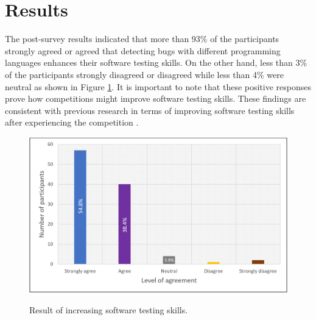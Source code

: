 \documentclass{article}
\begin{document}
\section{Results}
\label{section:results}
The post-survey results indicated that more than 93\% of the participants strongly agreed or agreed that detecting bugs with different programming languages enhances their software testing skills. On the other hand, less than 3\% of the participants strongly disagreed or disagreed while less than 4\% were neutral as shown in Figure \ref{fig:q.a}.
It is important to note that these positive responses prove how competitions might improve software testing skills. These findings are consistent with previous research in terms of improving software testing skills after experiencing the competition \cite{bryce2013bug}.  
\begin{figure}[!h]
{\includegraphics[width=\textwidth]{241_2.png}}
\caption{Result of increasing software testing skills.} \label{fig:q.a}
\end{figure}
\end{document}
